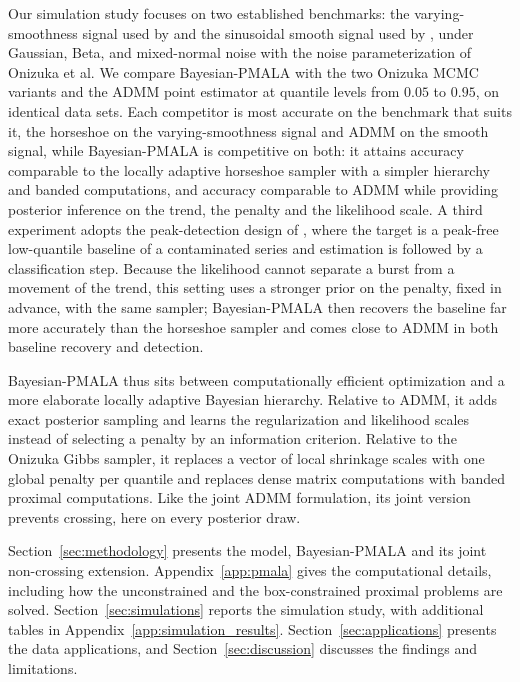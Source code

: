 Our simulation study focuses on two established benchmarks: the varying-smoothness signal used by \citet{onizuka2024fast} and the sinusoidal smooth signal used by \citet{brantley2020baseline}, under Gaussian, Beta, and mixed-normal noise with the noise parameterization of Onizuka et al. We compare Bayesian-PMALA with the two Onizuka MCMC variants and the ADMM point estimator at quantile levels from $0.05$ to $0.95$, on identical data sets. Each competitor is most accurate on the benchmark that suits it, the horseshoe on the varying-smoothness signal and ADMM on the smooth signal, while Bayesian-PMALA is competitive on both: it attains accuracy comparable to the locally adaptive horseshoe sampler with a simpler hierarchy and banded computations, and accuracy comparable to ADMM while providing posterior inference on the trend, the penalty and the likelihood scale. A third experiment adopts the peak-detection design of \citet{brantley2020baseline}, where the target is a peak-free low-quantile baseline of a contaminated series and estimation is followed by a classification step. Because the likelihood cannot separate a burst from a movement of the trend, this setting uses a stronger prior on the penalty, fixed in advance, with the same sampler; Bayesian-PMALA then recovers the baseline far more accurately than the horseshoe sampler and comes close to ADMM in both baseline recovery and detection.

Bayesian-PMALA thus sits between computationally efficient optimization and a more elaborate locally adaptive Bayesian hierarchy. Relative to ADMM, it adds exact posterior sampling and learns the regularization and likelihood scales instead of selecting a penalty by an information criterion. Relative to the Onizuka Gibbs sampler, it replaces a vector of local shrinkage scales with one global penalty per quantile and replaces dense matrix computations with banded proximal computations. Like the joint ADMM formulation, its joint version prevents crossing, here on every posterior draw.

Section~\ref{sec:methodology} presents the model, Bayesian-PMALA and its joint non-crossing extension. Appendix~\ref{app:pmala} gives the computational details, including how the unconstrained and the box-constrained proximal problems are solved. Section~\ref{sec:simulations} reports the simulation study, with additional tables in Appendix~\ref{app:simulation_results}. Section~\ref{sec:applications} presents the data applications, and Section~\ref{sec:discussion} discusses the findings and limitations.
